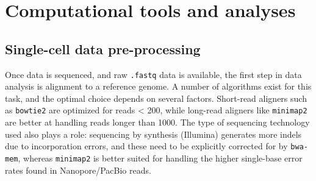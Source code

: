 \chapter{Computational tools and analyses}
\label{ch:computational}


\section{Single-cell data pre-processing}
Once data is sequenced, and raw \verb|.fastq| data is available, the first step in data analysis is alignment to a reference genome. A number of algorithms exist for this task, and the optimal choice depends on several factors. Short-read aligners such as \verb|bowtie2| are optimized for reads < \SI{200}{\bp}, while long-read aligners like \verb|minimap2| are better at handling reads longer than \SI{1000}{\bp}. The type of sequencing technology used also plays a role: sequencing by synthesis (Illumina) generates more indels due to incorporation errors, and these need to be explicitly corrected for by \verb|bwa-mem|, whereas \verb|minimap2| is better suited for handling the higher single-base error rates found in Nanopore/PacBio reads.

